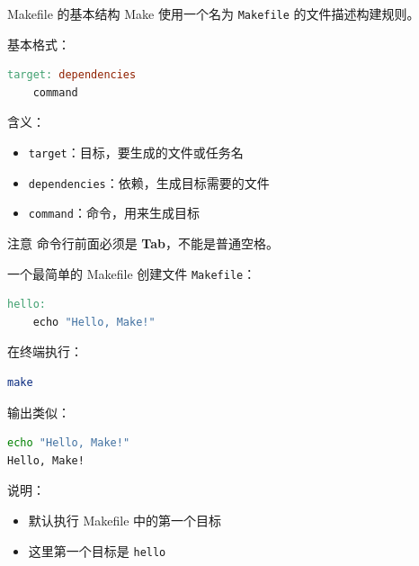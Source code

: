 \documentclass[aspectratio=169]{ctexbeamer}
\begin{document}
\begin{frame}[fragile]{Makefile 的基本结构}
Make 使用一个名为 \texttt{Makefile} 的文件描述构建规则。

基本格式：

\begin{lstlisting}[language=make]
target: dependencies
	command
\end{lstlisting}

含义：

\begin{itemize}
  \item \texttt{target}：目标，要生成的文件或任务名
  \item \texttt{dependencies}：依赖，生成目标需要的文件
  \item \texttt{command}：命令，用来生成目标
\end{itemize}

\begin{alertblock}{注意}
命令行前面必须是 \textbf{Tab}，不能是普通空格。
\end{alertblock}
\end{frame}

\begin{frame}[fragile]{一个最简单的 Makefile}
创建文件 \texttt{Makefile}：

\begin{lstlisting}[language=make]
hello:
	echo "Hello, Make!"
\end{lstlisting}

在终端执行：

\begin{lstlisting}[language=bash]
make
\end{lstlisting}

输出类似：

\begin{lstlisting}[language=bash]
echo "Hello, Make!"
Hello, Make!
\end{lstlisting}

说明：

\begin{itemize}
  \item 默认执行 Makefile 中的第一个目标
  \item 这里第一个目标是 \texttt{hello}
\end{itemize}
\end{frame}
\end{document}

